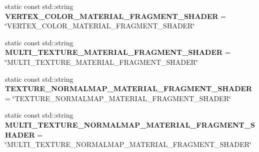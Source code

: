 \begin{DoxyCompactItemize}
\item 
\mbox{\label{struct_geometry_engine_1_1_geometry_material_1_1_material_constants_ab41d4bdc065ffcc53fc552b1e2a70209}} 
static const std\+::string {\bfseries V\+E\+R\+T\+E\+X\+\_\+\+C\+O\+L\+O\+R\+\_\+\+M\+A\+T\+E\+R\+I\+A\+L\+\_\+\+F\+R\+A\+G\+M\+E\+N\+T\+\_\+\+S\+H\+A\+D\+ER} = \char`\"{}V\+E\+R\+T\+E\+X\+\_\+\+C\+O\+L\+O\+R\+\_\+\+M\+A\+T\+E\+R\+I\+A\+L\+\_\+\+F\+R\+A\+G\+M\+E\+N\+T\+\_\+\+S\+H\+A\+D\+ER\char`\"{}
\item 
\mbox{\label{struct_geometry_engine_1_1_geometry_material_1_1_material_constants_ae16d3d3dccfe15e09f212f09630ff0e2}} 
static const std\+::string {\bfseries M\+U\+L\+T\+I\+\_\+\+T\+E\+X\+T\+U\+R\+E\+\_\+\+M\+A\+T\+E\+R\+I\+A\+L\+\_\+\+F\+R\+A\+G\+M\+E\+N\+T\+\_\+\+S\+H\+A\+D\+ER} = \char`\"{}M\+U\+L\+T\+I\+\_\+\+T\+E\+X\+T\+U\+R\+E\+\_\+\+M\+A\+T\+E\+R\+I\+A\+L\+\_\+\+F\+R\+A\+G\+M\+E\+N\+T\+\_\+\+S\+H\+A\+D\+ER\char`\"{}
\item 
\mbox{\label{struct_geometry_engine_1_1_geometry_material_1_1_material_constants_adbf507230da48d440a5493caad1d7e1a}} 
static const std\+::string {\bfseries T\+E\+X\+T\+U\+R\+E\+\_\+\+N\+O\+R\+M\+A\+L\+M\+A\+P\+\_\+\+M\+A\+T\+E\+R\+I\+A\+L\+\_\+\+F\+R\+A\+G\+M\+E\+N\+T\+\_\+\+S\+H\+A\+D\+ER} = \char`\"{}T\+E\+X\+T\+U\+R\+E\+\_\+\+N\+O\+R\+M\+A\+L\+M\+A\+P\+\_\+\+M\+A\+T\+E\+R\+I\+A\+L\+\_\+\+F\+R\+A\+G\+M\+E\+N\+T\+\_\+\+S\+H\+A\+D\+ER\char`\"{}
\item 
\mbox{\label{struct_geometry_engine_1_1_geometry_material_1_1_material_constants_a08e829164fa079343d7231ce94ed9f69}} 
static const std\+::string {\bfseries M\+U\+L\+T\+I\+\_\+\+T\+E\+X\+T\+U\+R\+E\+\_\+\+N\+O\+R\+M\+A\+L\+M\+A\+P\+\_\+\+M\+A\+T\+E\+R\+I\+A\+L\+\_\+\+F\+R\+A\+G\+M\+E\+N\+T\+\_\+\+S\+H\+A\+D\+ER} = \char`\"{}M\+U\+L\+T\+I\+\_\+\+T\+E\+X\+T\+U\+R\+E\+\_\+\+N\+O\+R\+M\+A\+L\+M\+A\+P\+\_\+\+M\+A\+T\+E\+R\+I\+A\+L\+\_\+\+F\+R\+A\+G\+M\+E\+N\+T\+\_\+\+S\+H\+A\+D\+ER\char`\"{}
\item 
\mbox{\label{struct_geometry_engine_1_1_geometry_material_1_1_material_constants_ae9a699f5019d0d6c5b65af60ad6cd6cb}} 

\end{DoxyCompactItemize}
